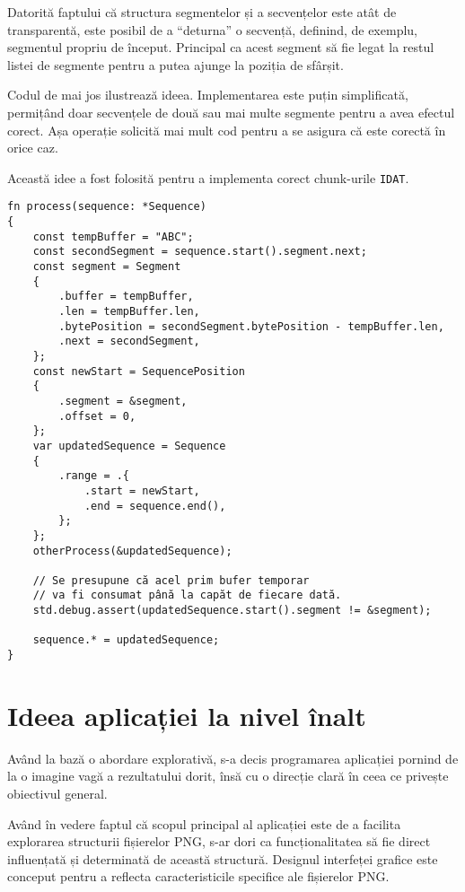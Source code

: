 \documentclass[a4paper,12pt]{report}
\begin{document}
Datorită faptului că structura segmentelor și a secvențelor este atât de transparentă,
este posibil de a ``deturna'' o secvență, definind, de exemplu, segmentul propriu de început.
Principal ca acest segment să fie legat la restul listei de segmente pentru a putea ajunge la poziția de sfârșit.

Codul de mai jos ilustrează ideea.
Implementarea este puțin simplificată,
permițând doar secvențele de două sau mai multe segmente pentru a avea efectul corect.
Așa operație solicită mai mult cod pentru a se asigura că este corectă în orice caz.

Această idee a fost folosită pentru a implementa corect chunk-urile \texttt{IDAT}.

\begin{verbatim}
fn process(sequence: *Sequence)
{
    const tempBuffer = "ABC";
    const secondSegment = sequence.start().segment.next;
    const segment = Segment
    {
        .buffer = tempBuffer,
        .len = tempBuffer.len,
        .bytePosition = secondSegment.bytePosition - tempBuffer.len,
        .next = secondSegment,
    };
    const newStart = SequencePosition
    {
        .segment = &segment,
        .offset = 0,
    };
    var updatedSequence = Sequence
    {
        .range = .{
            .start = newStart,
            .end = sequence.end(),
        };
    };
    otherProcess(&updatedSequence);

    // Se presupune că acel prim bufer temporar
    // va fi consumat până la capăt de fiecare dată.
    std.debug.assert(updatedSequence.start().segment != &segment);

    sequence.* = updatedSequence;
}
\end{verbatim}

\section{Ideea aplicației la nivel înalt}

Având la bază o abordare explorativă, s-a decis programarea aplicației
pornind de la o imagine vagă a rezultatului dorit,
însă cu o direcție clară în ceea ce privește obiectivul general.

Având în vedere faptul că scopul principal al aplicației
este de a facilita explorarea structurii fișierelor \ac{PNG},
s-ar dori ca funcționalitatea să fie direct
influențată și determinată de această structură.
Designul interfeței grafice este conceput pentru a reflecta
caracteristicile specifice ale fișierelor \ac{PNG}.
\end{document}
